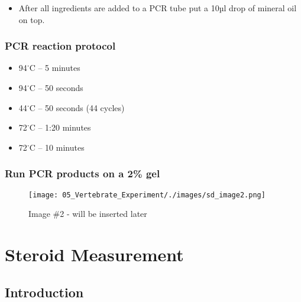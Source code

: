 \documentclass[
  letterpaper,
  DIV=11,
  numbers=noendperiod]{scrreprt}
\providecommand{\tightlist}{%
  \setlength{\itemsep}{0pt}\setlength{\parskip}{0pt}}\usepackage{longtable,booktabs,array}
\begin{document}
\begin{itemize}
\tightlist
\item
  After all ingredients are added to a PCR tube put a 10µl drop of
  mineral oil on top.
\end{itemize}

\hypertarget{pcr-reaction-protocol}{%
\subsection{PCR reaction protocol}\label{pcr-reaction-protocol}}

\begin{itemize}
\tightlist
\item
  94˙C -- 5 minutes
\item
  94˙C -- 50 seconds
\item
  44˙C -- 50 seconds (44 cycles)
\item
  72˙C -- 1:20 minutes
\item
  72˙C -- 10 minutes
\end{itemize}

\hypertarget{run-pcr-products-on-a-2-gel}{%
\subsection{Run PCR products on a 2\%
gel}\label{run-pcr-products-on-a-2-gel}}

\begin{figure}

{\centering \texttt{[image: 05\_Vertebrate\_Experiment/./images/sd\_image2.png]}

}

\caption{Image \#2 - will be inserted later}

\end{figure}

\hypertarget{sec-vert_exp_steroid_measure}{%
\chapter{Steroid Measurement}\label{sec-vert_exp_steroid_measure}}

\hypertarget{introduction-60}{%
\section{Introduction}\label{introduction-60}}
\end{document}
